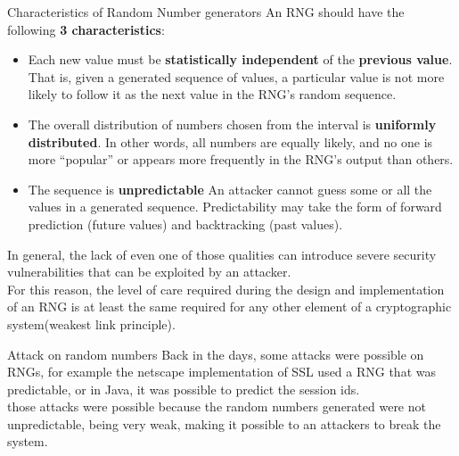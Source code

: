 \begin{subsection}{Characteristics of Random Number generators}
  An RNG should have the following \textbf{3 characteristics}:
  \begin{itemize}
    \item Each new value must be \textbf{statistically independent} of the \textbf{previous value}.
      \subitem That is, given a generated sequence of values, a particular value is not more likely 
       to follow it as the next value in the RNG's random sequence.
    \item The overall distribution of numbers chosen from the interval is \textbf{uniformly distributed}.
      \subitem In other words, all numbers are equally likely, and no one is more “popular” or 
        appears more frequently in the RNG’s output than others.
    \item The sequence is \textbf{unpredictable}
      \subitem An attacker cannot guess some or all the values in a generated sequence. Predictability 
        may take the form of forward prediction (future values) and backtracking (past values).
  \end{itemize}

  In general, the lack of even one of those qualities can introduce severe security vulnerabilities
  that can be exploited by an attacker.\\
  For this reason, the level of care required during the design and implementation of an RNG is
  at least the same required for any other element of a cryptographic system(weakest link principle).
\end{subsection}
\begin{paragraph}{Attack on random numbers}
  Back in the days, some attacks were possible on RNGs, for example the netscape implementation of 
  SSL used a RNG that was predictable, or in Java, it was possible to predict the session ids.\\
  those attacks were possible because the random numbers generated were not unpredictable, being very 
  weak, making it possible to an attackers to break the system.
\end{paragraph}

